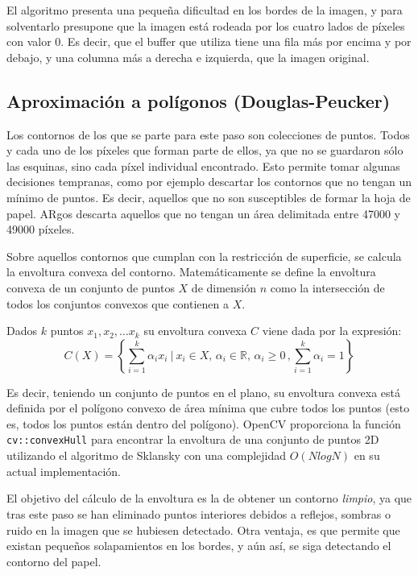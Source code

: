 El algoritmo presenta una pequeña dificultad en los bordes de la imagen, y para solventarlo
presupone que la imagen está rodeada por los cuatro lados de píxeles con valor 0. Es decir, que el
buffer que utiliza tiene una fila más por encima y por debajo, y una columna más a derecha e
izquierda, que la imagen original.


\subsection{Aproximación a polígonos (Douglas-Peucker)}
Los contornos de los que se parte para este paso son colecciones de puntos. Todos y cada uno de los
píxeles que forman parte de ellos, ya que no se guardaron sólo las esquinas, sino cada píxel
individual encontrado. Esto permite tomar algunas decisiones tempranas, como por ejemplo descartar
los contornos que no tengan un mínimo de puntos. Es decir, aquellos que no son susceptibles de formar
la hoja de papel. ARgos descarta aquellos que no tengan un área delimitada entre 47000 y 49000
píxeles.

Sobre aquellos contornos que cumplan con la restricción de superficie, se calcula la envoltura
convexa del contorno. Matemáticamente se define la envoltura convexa de un conjunto de puntos $X$ de
dimensión $n$ como la intersección de todos los conjuntos convexos que contienen a $X$.

Dados $k$ puntos $x_1, x_2,\dots x_k$ su envoltura convexa $C$ viene dada por la expresión:
\begin{equation}
C(X) =\left\{\sum_{i=1}^k \alpha_i x_i \ \Bigg | \ x_i\in X, \, \alpha_i\in \mathbb{R}, \, \alpha_i \geq 0 \, , \sum_{i=1}^k \alpha_i=1\right\}
\end{equation}

Es decir, teniendo un conjunto de puntos en el plano, su envoltura convexa está definida por el
polígono convexo de área mínima que cubre todos los puntos (esto es, todos los puntos están dentro
del polígono). OpenCV proporciona la función \texttt{cv::convexHull} para encontrar la envoltura de
una conjunto de puntos 2D utilizando el algoritmo de Sklansky con una complejidad $O(N log N)$ en su
actual implementación.

El objetivo del cálculo de la envoltura es la de obtener un contorno \emph{limpio}, ya que tras este
paso se han eliminado puntos interiores debidos a reflejos, sombras o ruido en la imagen que se hubiesen
detectado. Otra ventaja, es que permite que existan pequeños solapamientos en los bordes, y aún así, se
siga detectando el contorno del papel.

